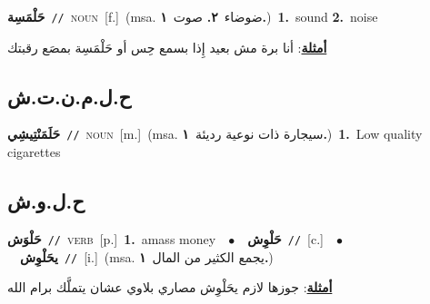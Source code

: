 \documentclass[10pt,a4paper,twoside]{article} %
\begin{document}
\begin{multicols}{2}
{\setlength\topsep{0pt}\textbf{\foreignlanguage{arabic}{حَلْمَسِة}}\ {\color{gray}\texttt{//}\color{black}}\ \textsc{noun}\ [f.]\ \color{gray}(msa. \foreignlanguage{arabic}{ضوضاء}~\foreignlanguage{arabic}{\textbf{٢.}}  \foreignlanguage{arabic}{صوت}~\foreignlanguage{arabic}{\textbf{١.}})\color{black}\ \textbf{1.}~sound  \textbf{2.}~noise\  \begin{flushright}\color{gray}\foreignlanguage{arabic}{\textbf{\underline{\foreignlanguage{arabic}{أمثلة}}}: أنا برة مش بعيد إِذا بسمع حِس أو حَلْمَسِة بمصَع رقبتك}\end{flushright}\color{black}} \vspace{2mm}

\vspace{-3mm}
\subsection*{\color{blue}\foreignlanguage{arabic}{ح.ل.م.ن.ت.ش}\color{blue}{ (ntws)}} 

{\setlength\topsep{0pt}\textbf{\foreignlanguage{arabic}{حَلَمَنْتِيشِي}}\ {\color{gray}\texttt{//}\color{black}}\ \textsc{noun}\ [m.]\ \color{gray}(msa. \foreignlanguage{arabic}{سيجارة ذات نوعية رديئة}~\foreignlanguage{arabic}{\textbf{١.}})\color{black}\ \textbf{1.}~Low quality cigarettes\ } \vspace{2mm}

\vspace{-3mm}
\subsection*{\color{blue}\foreignlanguage{arabic}{ح.ل.و.ش}\color{blue}{}} 

{\setlength\topsep{0pt}\textbf{\foreignlanguage{arabic}{حَلْوَش}}\ {\color{gray}\texttt{//}\color{black}}\ \textsc{verb}\ [p.]\ \textbf{1.}~amass money\ \ $\bullet$\ \ \setlength\topsep{0pt}\textbf{\foreignlanguage{arabic}{حَلْوِش}}\ {\color{gray}\texttt{//}\color{black}}\ [c.]\ \ $\bullet$\ \ \setlength\topsep{0pt}\textbf{\foreignlanguage{arabic}{يحَلْوِش}}\ {\color{gray}\texttt{//}\color{black}}\ [i.]\ \color{gray}(msa. \foreignlanguage{arabic}{يجمع الكثير من المال}~\foreignlanguage{arabic}{\textbf{١.}})\color{black}\  \begin{flushright}\color{gray}\foreignlanguage{arabic}{\textbf{\underline{\foreignlanguage{arabic}{أمثلة}}}: جوزها لازم يحَلْوِش مصاري بلاوي عشان يتملَّك برام الله}\end{flushright}\color{black}} \vspace{2mm}


\end{multicols}
\end{document}
